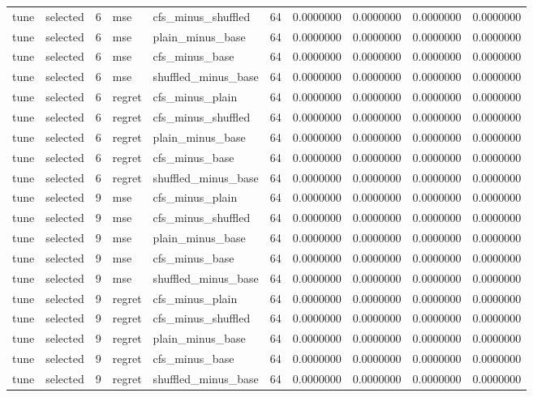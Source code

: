 \begin{tabular}{llrllrrrrr}
tune & selected & 6 & mse & cfs_minus_shuffled & 64 & 0.0000000 & 0.0000000 & 0.0000000 & 0.0000000 \\
tune & selected & 6 & mse & plain_minus_base & 64 & 0.0000000 & 0.0000000 & 0.0000000 & 0.0000000 \\
tune & selected & 6 & mse & cfs_minus_base & 64 & 0.0000000 & 0.0000000 & 0.0000000 & 0.0000000 \\
tune & selected & 6 & mse & shuffled_minus_base & 64 & 0.0000000 & 0.0000000 & 0.0000000 & 0.0000000 \\
tune & selected & 6 & regret & cfs_minus_plain & 64 & 0.0000000 & 0.0000000 & 0.0000000 & 0.0000000 \\
tune & selected & 6 & regret & cfs_minus_shuffled & 64 & 0.0000000 & 0.0000000 & 0.0000000 & 0.0000000 \\
tune & selected & 6 & regret & plain_minus_base & 64 & 0.0000000 & 0.0000000 & 0.0000000 & 0.0000000 \\
tune & selected & 6 & regret & cfs_minus_base & 64 & 0.0000000 & 0.0000000 & 0.0000000 & 0.0000000 \\
tune & selected & 6 & regret & shuffled_minus_base & 64 & 0.0000000 & 0.0000000 & 0.0000000 & 0.0000000 \\
tune & selected & 9 & mse & cfs_minus_plain & 64 & 0.0000000 & 0.0000000 & 0.0000000 & 0.0000000 \\
tune & selected & 9 & mse & cfs_minus_shuffled & 64 & 0.0000000 & 0.0000000 & 0.0000000 & 0.0000000 \\
tune & selected & 9 & mse & plain_minus_base & 64 & 0.0000000 & 0.0000000 & 0.0000000 & 0.0000000 \\
tune & selected & 9 & mse & cfs_minus_base & 64 & 0.0000000 & 0.0000000 & 0.0000000 & 0.0000000 \\
tune & selected & 9 & mse & shuffled_minus_base & 64 & 0.0000000 & 0.0000000 & 0.0000000 & 0.0000000 \\
tune & selected & 9 & regret & cfs_minus_plain & 64 & 0.0000000 & 0.0000000 & 0.0000000 & 0.0000000 \\
tune & selected & 9 & regret & cfs_minus_shuffled & 64 & 0.0000000 & 0.0000000 & 0.0000000 & 0.0000000 \\
tune & selected & 9 & regret & plain_minus_base & 64 & 0.0000000 & 0.0000000 & 0.0000000 & 0.0000000 \\
tune & selected & 9 & regret & cfs_minus_base & 64 & 0.0000000 & 0.0000000 & 0.0000000 & 0.0000000 \\
tune & selected & 9 & regret & shuffled_minus_base & 64 & 0.0000000 & 0.0000000 & 0.0000000 & 0.0000000 \\

\end{tabular}
